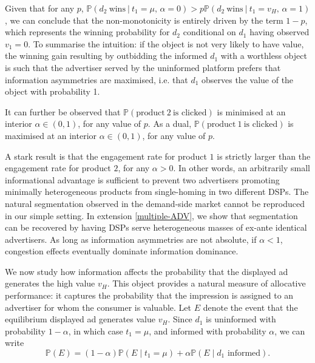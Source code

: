 \documentclass[11pt]{article}
\theoremstyle{plain}
\theoremstyle{definition}
\theoremstyle{plain}
\theoremstyle{plain}
\theoremstyle{plain}
\theoremstyle{plain}
\numberwithin{equation}{section}
\begin{document}
\noindent Given that for any $p$, $\mathbb{P}(d_2 \ \textrm{wins} \ | \ t_1 = \mu, \, \alpha = 0)>p \mathbb{P}(d_2 \ \textrm{wins} \ | \ t_1 = v_H, \, \alpha = 1)$, we can conclude that the non-monotonicity is entirely driven by the term $1-p$, which represents the winning probability for $d_2$ conditional on $d_1$ having observed $v_1 = 0$. To summarise the intuition: if the object is not very likely to have value, the winning gain resulting by outbidding the informed $d_1$ with a worthless object is such that the advertiser served by the uninformed platform prefers that information asymmetries are maximised, i.e. that $d_1$ observes the value of the object with probability 1. \par 
\vspace{2mm}
\noindent It can further be observed that $\mathbb{P}(\text{product} \ 2 \ \text{is clicked})$ is minimised at an interior $\alpha \in (0,1)$, for any value of $p$. As a dual, $\mathbb{P}(\text{product} \ 1 \ \text{is clicked})$ is maximised at an interior $\alpha \in (0,1)$, for any value of $p$.  \par 
\vspace{2mm}
\noindent A stark result is that the engagement rate for product $1$ is strictly larger than the engagement rate for product $2$, for any $\alpha > 0$. In other words, an arbitrarily small informational advantage is sufficient to prevent two advertisers promoting minimally heterogeneous products from single-homing in two different DSPs. The natural segmentation observed in the demand-side market cannot be reproduced in our simple setting. In extension \ref{multiple-ADV}, we show that segmentation can be recovered by having DSPs serve heterogeneous masses of ex-ante identical advertisers. As long as information asymmetries are not absolute, if $\alpha < 1$, congestion effects eventually dominate information dominance.
\vspace{0.8cm}



\newpage
We now study how information affects the probability that the displayed ad generates the high value $ v_H $. This object provides a natural measure of allocative performance: it captures the probability that the impression is assigned to an advertiser for whom the consumer is valuable. Let $ E $ denote the event that the equilibrium displayed ad generates value $ v_H $. Since $ d_1 $ is uninformed with probability $ 1-\alpha $, in which case $ t_1 = \mu $, and informed with probability $ \alpha $, we can write
\begin{equation}\label{HP}\tag{HP}
\mathbb{P}(E)
=
(1 - \alpha)\mathbb{P}(E \mid t_1 = \mu)
+
\alpha \mathbb{P}(E \mid d_1 \text{ informed}).
\end{equation}
\end{document}
